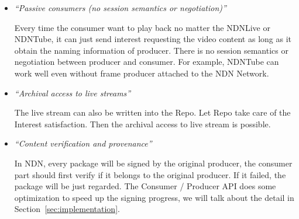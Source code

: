 \begin{itemize}
\item{\textit{``Passive consumers (no session semantics or negotiation)''}}

Every time the consumer want to play back no matter the NDNLive or NDNTube, it can just send interest requesting the video content as long as it obtain the naming information of producer. There is no session semantics or negotiation between producer and consumer. For example, NDNTube can work well even without frame producer attached to the NDN Network.

\item{\textit{``Archival access to live streams''}}

The live stream can also be written into the Repo. Let Repo take care of the Interest satisfaction. Then the archival access to live stream is possible.

\item{\textit{``Content verification and provenance''}}

In NDN, every package will be signed by the original producer, the consumer part should first verify if it belongs to the original producer. If it failed, the package will be just regarded. The Consumer / Producer API does some optimization to speed up the signing progress, we will talk about the detail in Section~\ref{sec:implementation}.

\end{itemize} 

